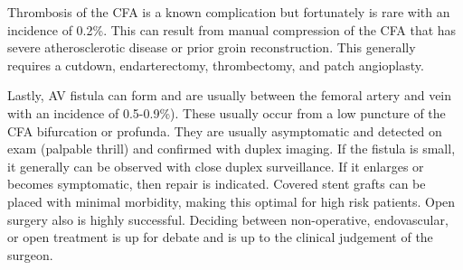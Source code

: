 \documentclass[
]{book}
\begin{document}
Thrombosis of the CFA is a known complication but fortunately is rare
with an incidence of 0.2\%. This can result from manual compression of
the CFA that has severe atherosclerotic disease or prior groin
reconstruction. This generally requires a cutdown, endarterectomy,
thrombectomy, and patch angioplasty.

Lastly, AV fistula can form and are usually between the femoral artery
and vein with an incidence of 0.5-0.9\%). These usually occur from a low
puncture of the CFA bifurcation or profunda. They are usually
asymptomatic and detected on exam (palpable thrill) and confirmed with
duplex imaging. If the fistula is small, it generally can be observed
with close duplex surveillance. If it enlarges or becomes symptomatic,
then repair is indicated. Covered stent grafts can be placed with
minimal morbidity, making this optimal for high risk patients. Open
surgery also is highly successful. Deciding between non-operative,
endovascular, or open treatment is up for debate and is up to the
clinical judgement of the surgeon.

  
\end{document}

